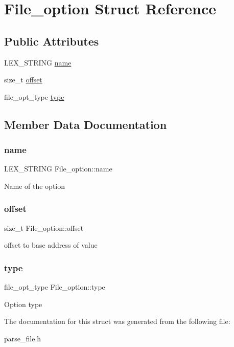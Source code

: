 \hypertarget{structFile__option}{}\section{File\+\_\+option Struct Reference}
\label{structFile__option}
\subsection*{Public Attributes}
\begin{DoxyCompactItemize}
\item 
L\+E\+X\+\_\+\+S\+T\+R\+I\+NG \mbox{\hyperlink{structFile__option_a29b0cbb67bc7730ff0d0cd3f2b1572ab}{name}}
\item 
size\+\_\+t \mbox{\hyperlink{structFile__option_a738962dc8891f3834bfb3e885a808e68}{offset}}
\item 
file\+\_\+opt\+\_\+type \mbox{\hyperlink{structFile__option_a1f1e1890ec34be76e59d084b004f444e}{type}}
\end{DoxyCompactItemize}


\subsection{Member Data Documentation}
\mbox{\label{structFile__option_a29b0cbb67bc7730ff0d0cd3f2b1572ab}} 
\subsubsection{\texorpdfstring{name}{name}}
{\footnotesize\ttfamily L\+E\+X\+\_\+\+S\+T\+R\+I\+NG File\+\_\+option\+::name}

Name of the option \mbox{\label{structFile__option_a738962dc8891f3834bfb3e885a808e68}} 
\subsubsection{\texorpdfstring{offset}{offset}}
{\footnotesize\ttfamily size\+\_\+t File\+\_\+option\+::offset}

offset to base address of value \mbox{\label{structFile__option_a1f1e1890ec34be76e59d084b004f444e}} 
\subsubsection{\texorpdfstring{type}{type}}
{\footnotesize\ttfamily file\+\_\+opt\+\_\+type File\+\_\+option\+::type}

Option type 

The documentation for this struct was generated from the following file\+:\begin{DoxyCompactItemize}
\item 
parse\+\_\+file.\+h\end{DoxyCompactItemize}
